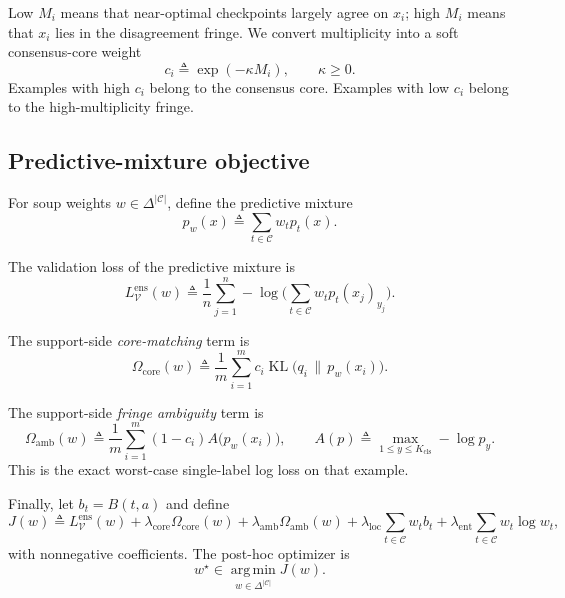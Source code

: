 \documentclass{article}
\newcommand{\cC}{\mathcal{C}}
\newcommand{\cV}{\mathcal{V}}
\newcommand{\argmin}{\operatorname*{arg\,min}}
\newcommand{\KL}{\operatorname{KL}}
\newcommand{\simplex}{\Delta}
\begin{document}
Low $M_i$ means that near-optimal checkpoints largely agree on $x_i$; high $M_i$ means that $x_i$ lies in the disagreement fringe. We convert multiplicity into a soft consensus-core weight
\begin{equation}
    c_i
    \triangleq
    \exp(-\kappa M_i),
    \qquad
    \kappa \ge 0.
    \label{eq:core_weight}
\end{equation}
Examples with high $c_i$ belong to the consensus core. Examples with low $c_i$ belong to the high-multiplicity fringe.

\subsection{Predictive-mixture objective}

For soup weights $w \in \simplex^{|\cC|}$, define the predictive mixture
\begin{equation}
    p_w(x)
    \triangleq
    \sum_{t\in\cC} w_t p_t(x).
    \label{eq:mixture}
\end{equation}

The validation loss of the predictive mixture is
\begin{equation}
    L_{\cV}^{\mathrm{ens}}(w)
    \triangleq
    \frac{1}{n}
    \sum_{j=1}^{n}
    -\log\!\Big(
        \sum_{t\in\cC} w_t p_t(x_j)_{y_j}
    \Big).
    \label{eq:ensval}
\end{equation}

The support-side \emph{core-matching} term is
\begin{equation}
    \Omega_{\mathrm{core}}(w)
    \triangleq
    \frac{1}{m}
    \sum_{i=1}^{m}
    c_i \KL\!\big(q_i \,\|\, p_w(x_i)\big).
    \label{eq:core_term}
\end{equation}

The support-side \emph{fringe ambiguity} term is
\begin{equation}
    \Omega_{\mathrm{amb}}(w)
    \triangleq
    \frac{1}{m}
    \sum_{i=1}^{m}
    (1-c_i)
    A\!\big(p_w(x_i)\big),
    \qquad
    A(p) \triangleq \max_{1\le y\le K_{\mathrm{cls}}} -\log p_y.
    \label{eq:amb_term}
\end{equation}
This is the exact worst-case single-label log loss on that example.

Finally, let $b_t = B(t,a)$ and define
\begin{equation}
    J(w)
    \triangleq
    L_{\cV}^{\mathrm{ens}}(w)
    + \lambda_{\mathrm{core}} \Omega_{\mathrm{core}}(w)
    + \lambda_{\mathrm{amb}} \Omega_{\mathrm{amb}}(w)
    + \lambda_{\mathrm{loc}} \sum_{t\in\cC} w_t b_t
    + \lambda_{\mathrm{ent}} \sum_{t\in\cC} w_t \log w_t,
    \label{eq:objective}
\end{equation}
with nonnegative coefficients. The post-hoc optimizer is
\begin{equation}
    w^{\star}
    \in
    \argmin_{w\in\simplex^{|\cC|}} J(w).
    \label{eq:optimizer}
\end{equation}
\end{document}

